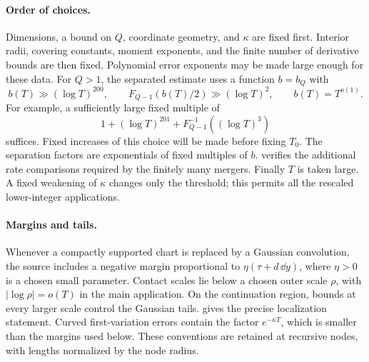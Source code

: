 \paragraph{Order of choices.}
Dimensions, a bound on $Q$, coordinate geometry, and $\kappa$ are fixed first.
Interior radii, covering constants, moment exponents, and the finite number
of derivative bounds are then fixed. Polynomial error exponents may be made
large enough for these data. For $Q>1$, the separated estimate uses a function
$b=b_Q$ with
\begin{equation}\label{eq:choice-b}
 b(T)\gg(\log T)^{200},\qquad
 F_{Q-1}(b(T)/2)\gg(\log T)^2,\qquad b(T)=T^{o(1)}.
\end{equation}
For example, a sufficiently large fixed multiple of
\[
 1+(\log T)^{201}
   +F_{Q-1}^{-1}((\log T)^3)
\]
suffices. Fixed increases of this choice will be made before fixing $T_0$.
The separation factors are exponentials of fixed multiples of $b$.
 verifies the additional rate comparisons required by the
finitely many mergers. Finally $T$ is taken large. A fixed weakening of
$\kappa$ changes only the threshold; this permits all the rescaled
lower-integer applications.

\paragraph{Margins and tails.}
Whenever a compactly supported chart is replaced by a Gaussian convolution,
the source includes a negative margin proportional to
$\eta(\tau+d\,\dd y)$, where $\eta>0$ is a chosen small parameter.
Contact scales lie below a chosen outer scale
$\rho$, with $|\log\rho|=o(T)$ in the main application. On the continuation
region, bounds at every larger scale control the Gaussian tails.
 gives the precise localization statement. Curved
first-variation errors contain the factor $e^{-\kappa T}$, which is smaller
than the margins used below. These conventions are retained at recursive
nodes, with lengths normalized by the node radius.
